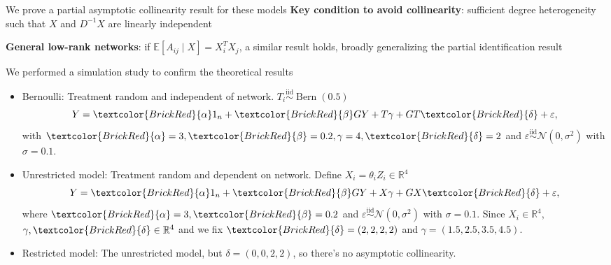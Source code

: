 \documentclass[aspectratio=169]{beamer}
\newcommand \calN {\mathcal{N}}
\newcommand{\R}{\mathbb{R}}
\newcommand \diid {\stackrel{\mathrm{iid}}{\sim}}
\DeclareMathOperator*{\Bern}{Bern}
\theoremstyle{remark}
\begin{document}
\begin{frame}{We prove a partial asymptotic collinearity result for these models}
    \textbf{Key condition to avoid collinearity}: sufficient degree heterogeneity such that $X$ and $D^{-1} X$ are linearly independent
    
    \vspace{4mm}
    \textbf{General low-rank networks}: if $\mathbb E[ A_{ij} \mid X ] = X_i^T X_j$, a similar result holds, broadly generalizing the partial identification result
\end{frame}

\begin{frame}{We performed a simulation study to confirm the theoretical results}
    \begin{itemize}
        \setlength\itemsep{1.75em}
        \item \textcolor{BrickRed}{Bernoulli}: Treatment random and independent of network. $T_i \diid \Bern(0.5)$
              \begin{equation*}
                  Y = \textcolor{BrickRed}{\alpha} 1_n + \textcolor{BrickRed}{\beta} G Y + T \gamma + G T \textcolor{BrickRed}{\delta} + \varepsilon,
              \end{equation*}
              with $\textcolor{BrickRed}{\alpha} = 3, \textcolor{BrickRed}{\beta} = 0.2, \gamma = 4, \textcolor{BrickRed}{\delta} = 2$ and $\varepsilon \diid \calN(0, \sigma^2)$ with $\sigma = 0.1$.
        \item \textcolor{BrickRed}{Unrestricted model}: Treatment random and dependent on network. Define $X_i = \theta_i Z_i \in \R^4$
              \begin{equation*}
                  Y = \textcolor{BrickRed}{\alpha} 1_n + \textcolor{BrickRed}{\beta} G Y + X \gamma + G X \textcolor{BrickRed}{\delta} + \varepsilon,
              \end{equation*}
              where $\textcolor{BrickRed}{\alpha} = 3, \textcolor{BrickRed}{\beta} = 0.2$ and $\varepsilon \diid \calN(0, \sigma^2)$ with $\sigma = 0.1$. Since $X_i \in \R^4$, $\gamma, \textcolor{BrickRed}{\delta} \in \R^4$ and we fix $\textcolor{BrickRed}{\delta} = (2, 2, 2, 2)$ and $\gamma = (1.5, 2.5, 3.5, 4.5)$.
        \item Restricted model: The unrestricted model, but $\delta = (0, 0, 2, 2)$, so there's no asymptotic collinearity.
    \end{itemize}
\end{frame}
\end{document}
